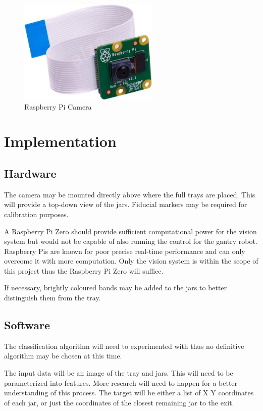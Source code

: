\documentclass[11pt]{article}
\begin{document}
            \begin{figure}[ht]
                \centering
                \includegraphics[height=5cm]{camera.jpg}
                \caption{Raspberry Pi Camera}\label{fig:camera}
            \end{figure}

    \section{Implementation}\label{sec:imp}
        \subsection{Hardware}
            The camera may be mounted directly above where the full trays are placed. This will provide a top-down view of the jars. Fiducial markers may be required for calibration purposes. 

            A Raspberry Pi Zero should provide sufficient computational power for the vision system but would not be capable of also running the control for the gantry robot. Raspberry Pis are known for poor precise real-time performance and can only overcome it with more computation. Only the vision system is within the scope of this project thus the Raspberry Pi Zero will suffice.

            If necessary, brightly coloured bands may be added to the jars to better distinguish them from the tray.

        \subsection{Software}
            The classification algorithm will need to experimented with thus no definitive algorithm may be chosen at this time.

            The input data will be an image of the tray and jars. This will need to be parameterized into features. More research will need to happen for a better understanding of this process. The target will be either a list of X Y coordinates of each jar, or just the coordinates of the closest remaining jar to the exit.
\end{document}
